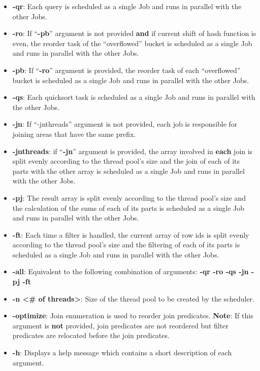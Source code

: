 \documentclass{ws-ijprai}
\begin{document}
\begin{itemize}
    \item \textbf{-qr}: Each query is scheduled as a single Job and runs in parallel with the other Jobs.
    \item \textbf{-ro}: If “\textbf{-pb}” argument is not provided \textbf{and} if current shift of hash function is even, the reorder task of the “overflowed” bucket is scheduled as a single Job and runs in parallel with the other Jobs.
    \item \textbf{-pb}: If “\textbf{-ro}” argument is provided, the reorder task of each “overflowed” bucket is scheduled as a single Job and runs in parallel with the other Jobs.
    \item \textbf{-qs}: Each quicksort task is scheduled as a single Job and runs in parallel with the other Jobs.
    \item \textbf{-jn}: If “-jnthreads” argument is not provided, each job is responsible for joining areas that have the same prefix.
    \item \textbf{-jnthreads}: if “\textbf{-jn}” argument is provided, the array involved in \textbf{each} join is split evenly according to the thread pool’s size and the join of each of its parts with the other array is scheduled as a single Job and runs in parallel with the other Jobs.
    \item \textbf{-pj}: The result array is split evenly according to the thread pool’s size and the calculation of the sums of each of its parts is scheduled as a single Job and runs in parallel with the other Jobs.
    \item \textbf{-ft}: Each time a filter is handled, the current array of row ids is split evenly according to the thread pool’s size and the filtering of each of its parts is scheduled as a single Job and runs in parallel with the other Jobs.
    \item \textbf{-all}: Equivalent to the following combination of arguments: \textbf{-qr -ro -qs -jn -pj -ft}
    \item \textbf{-n \textless \# of threads\textgreater}: Size of the thread pool to be created by the scheduler.
    \item \textbf{-optimize}: Join enumeration is used to reorder join predicates. \textbf{Note}: If this argument is \textbf{not} provided, join predicates are not reordered but filter predicates are relocated before the join predicates.
    \item \textbf{-h}: Displays a help message which contains a short description of each argument.
 \end{itemize}
 
\end{document}
